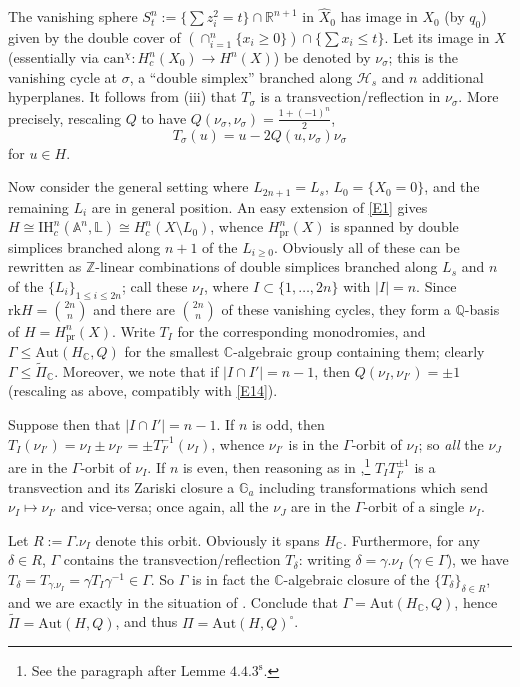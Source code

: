 \documentclass[12pt,letterpaper,english]{amsart}
\numberwithin{equation}{section}
\numberwithin{figure}{section}
\theoremstyle{plain}
\theoremstyle{remark}
\theoremstyle{definition}
\theoremstyle{definition}
\theoremstyle{plain}
\theoremstyle{plain}
\theoremstyle{plain}
\theoremstyle{plain}
\theoremstyle{definition}
\def\QQ{\mathbb{Q}}
\def\RR{\mathbb{R}}
\def\CC{\mathbb{C}}
\def\ZZ{\mathbb{Z}}
\def\H{\mathcal{H}}
\def\IH{\mathrm{IH}}
\def\LL{\mathbb{L}}
\def\can{\mathrm{can}}
\def\sm{\setminus}
\theoremstyle{definition}
\begin{document}
The vanishing sphere $S^n_t:=\{\sum z_i^2=t\}\cap \RR^{n+1}$ in $\hat{X}_0$ has image in $X_0$ (by $q_0$) given by the double cover of $(\cap_{i=1}^n\{x_i\geq 0\})\cap \{\sum x_i\leq t\}$.  Let its image in $X$ (essentially via $\can^{\chi}\colon H^n_c(X_0)\to H^n(X)$) be denoted by $\nu_{\sigma}$; this is the vanishing cycle at $\sigma$, a ``double simplex'' branched along $\H_s$ and $n$ additional hyperplanes. It follows from (iii) that $T_{\sigma}$ is a transvection/reflection in $\nu_{\sigma}$. More precisely, rescaling $Q$ to have $Q(\nu_{\sigma},\nu_{\sigma})=\tfrac{1+(-1)^n}{2}$,
\begin{equation}\label{E14}
T_{\sigma}(u)=u-2Q(u,\nu_{\sigma})\nu_{\sigma}	
\end{equation}
for $u\in H$.

Now consider the general setting where $L_{2n+1}=L_s$, $L_0=\{X_0=0\}$, and the remaining $L_i$ are in general position. An easy extension of \eqref{E1} gives $H\cong \IH^n_c(\mathbb{A}^n,\LL)\cong H^n_c(X\sm L_0)$, whence $H^n_{\mathrm{pr}}(X)$ is spanned by double simplices branched along $n+1$ of the $L_{i\geq 0}$. Obviously all of these can be rewritten as $\ZZ$-linear combinations of double simplices branched along $L_s$ and $n$ of the $\{L_i\}_{1\leq i\leq 2n}$; call these $\nu_I$, where $I\subset \{1,\ldots,2n\}$ with $|I|=n$. Since $\mathrm{rk}H=\binom{2n}{n}$ and there are $\binom{2n}{n}$ of these vanishing cycles, they form a $\QQ$-basis of $H=H_{\text{pr}}^n(X)$. Write $T_I$ for the corresponding monodromies, and $\Gamma\leq \mathrm{Aut}(H_{\CC},Q)$ for the smallest $\CC$-algebraic group containing them; clearly $\Gamma\leq \widetilde{\Pi}_{\CC}$. Moreover, we note that if $|I\cap I'|=n-1$, then $Q(\nu_I,\nu_{I'})=\pm 1$ (rescaling as above, compatibly with \eqref{E14}).

Suppose then that $|I\cap I'|=n-1$.  If $n$ is odd, then $T_I(\nu_{I'})=\nu_I\pm \nu_{I'}=\pm T_{I'}^{-1}(\nu_I)$, whence $\nu_{I'}$ is in the $\Gamma$-orbit of $\nu_I$; so \emph{all} the $\nu_J$ are in the $\Gamma$-orbit of $\nu_I$. If $n$ is even, then reasoning as in \cite[\S4.4]{De},\footnote{See the paragraph after Lemme $4.4.3^{\text{s}}$.} $T_I T_{I'}^{\pm 1}$ is a transvection and its Zariski closure a $\mathbb{G}_a$ including transformations which send $\nu_I \mapsto \nu_{I'}$ and vice-versa; once again, all the $\nu_J$ are in the $\Gamma$-orbit of a single $\nu_I$.

Let $R:=\Gamma.\nu_I$ denote this orbit.  Obviously it spans $H_{\CC}$. Furthermore, for any $\delta\in R$, $\Gamma$ contains the transvection/reflection $T_{\delta}$: writing $\delta=\gamma.\nu_I$ ($\gamma\in \Gamma$), we have $T_{\delta}=T_{\gamma.\nu_I}=\gamma T_I\gamma^{-1}\in \Gamma$. So $\Gamma$ is in fact the $\CC$-algebraic closure of the $\{T_{\delta}\}_{\delta \in R}$, and we are exactly in the situation of \cite[Lemme 4.4.2]{De}. Conclude that $\Gamma=\mathrm{Aut}(H_{\CC},Q)$, hence $\widetilde{\Pi}=\mathrm{Aut}(H,Q)$, and thus $\Pi=\mathrm{Aut}(H,Q)^{\circ}$.
\end{document}
